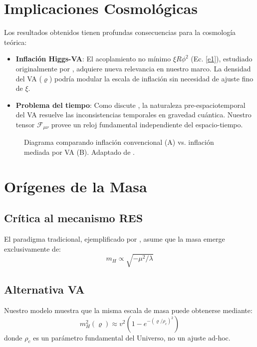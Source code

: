 \documentclass[twoside]{article}
\theoremstyle{definition}
\theoremstyle{remark}
\numberwithin{equation}{section}
\theoremstyle{definition}
\theoremstyle{example}
\theoremstyle{remark}
\numberwithin{equation}{section}%
\begin{document}
		\section{Implicaciones Cosmológicas}
		Los resultados obtenidos tienen profundas consecuencias para la cosmología teórica:
		
		\begin{itemize}
			\item \textbf{Inflación Higgs-VA}: El acoplamiento no mínimo $\xi R \phi^2$ (Ec. \ref{e1}), estudiado originalmente por \cite{Bezrukov2008}, adquiere nueva relevancia en nuestro marco. La densidad del VA ($\varrho$) podría modular la escala de inflación sin necesidad de ajuste fino de $\xi$.
			
			\item \textbf{Problema del tiempo}: Como discute \cite{Anderson2012}, la naturaleza pre-espaciotemporal del VA resuelve las inconsistencias temporales en gravedad cuántica. Nuestro tensor $\mathcal{F}_{\mu\nu}$ provee un reloj fundamental independiente del espacio-tiempo.
		\end{itemize}
		
		\begin{figure}[H]
			\centering
			
			\caption{Diagrama comparando inflación convencional (A) vs. inflación mediada por VA (B). Adaptado de \cite{Bezrukov2008}.}
			\label{fig:inflacion}
		\end{figure}
		
		\section{Orígenes de la Masa}
		\subsection{Crítica al mecanismo RES}
		El paradigma tradicional, ejemplificado por \cite{Wilczek2013}, asume que la masa emerge exclusivamente de:
		\begin{equation}
			m_H \propto \sqrt{-\mu^2/\lambda}
		\end{equation}
		
		\subsection{Alternativa VA}
		Nuestro modelo muestra que la misma escala de masa puede obtenerse mediante:
		\begin{equation}
			m_H^2(\varrho) \approx v^2(1 - e^{-(\varrho/\rho_c)^2})
		\end{equation}
		donde $\rho_c$ es un parámetro fundamental del Universo, no un ajuste ad-hoc.
		
\end{document}
